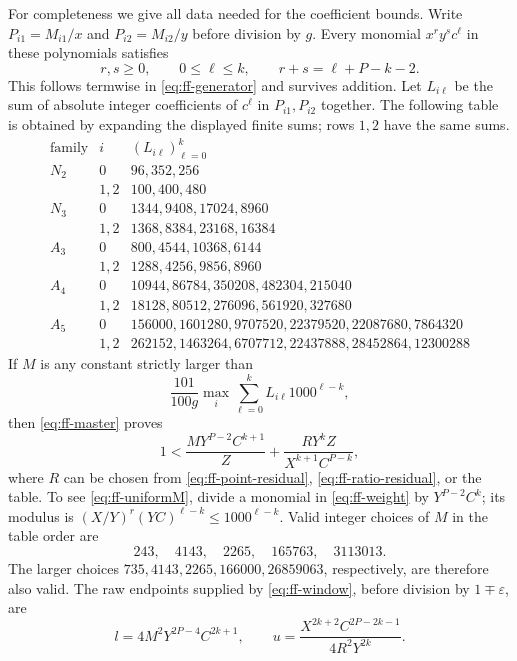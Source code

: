 \documentclass[12pt]{article}
\numberwithin{equation}{section}
\begin{document}
For completeness we give all data needed for the coefficient bounds.
Write $P_{i1}=M_{i1}/x$ and $P_{i2}=M_{i2}/y$ before division by $g$.
Every monomial $x^r y^s c^\ell$ in these polynomials satisfies
\begin{equation}\label{eq:ff-weight}
 r,s\ge0,\qquad 0\le\ell\le k,\qquad r+s=\ell+P-k-2.
\end{equation}
This follows termwise in \eqref{eq:ff-generator} and survives addition.
Let $L_{i\ell}$ be the sum of absolute integer coefficients of
$c^\ell$ in $P_{i1},P_{i2}$ together. The following table is obtained
by expanding the displayed finite sums; rows $1,2$ have the same sums.
\[
\begin{array}{c|c|l}
 \text{family}&i&(L_{i\ell})_{\ell=0}^k\\ \hline
N_2&0&96,352,256\\
 &1,2&100,400,480\\
N_3&0&1344,9408,17024,8960\\
 &1,2&1368,8384,23168,16384\\
A_3&0&800,4544,10368,6144\\
 &1,2&1288,4256,9856,8960\\
A_4&0&10944,86784,350208,482304,215040\\
 &1,2&18128,80512,276096,561920,327680\\
A_5&0&156000,1601280,9707520,22379520,22087680,7864320\\
 &1,2&262152,1463264,6707712,22437888,28452864,12300288
\end{array}
\]
If $M$ is any constant strictly larger than
\begin{equation}\label{eq:ff-uniformM}
 \frac{101}{100g}\max_i\sum_{\ell=0}^k
                       L_{i\ell}1000^{\ell-k},
\end{equation}
then \eqref{eq:ff-master} proves
\begin{equation}\label{eq:ff-two-inequality}
 1<\frac{M Y^{P-2}C^{k+1}}Z
       +\frac{R Y^kZ}{X^{k+1}C^{P-k}},
\end{equation}
where $R$ can be chosen from \eqref{eq:ff-point-residual},
\eqref{eq:ff-ratio-residual}, or the table.
To see \eqref{eq:ff-uniformM}, divide a monomial in
\eqref{eq:ff-weight} by $Y^{P-2}C^k$; its modulus is
$(X/Y)^r(YC)^{\ell-k}\le1000^{\ell-k}$.
Valid integer choices of $M$ in the table order are
\[
 243,\quad4143,\quad2265,\quad165763,\quad3113013.
\]
The larger choices $735,4143,2265,166000,26859063$, respectively,
are therefore also valid. The raw endpoints supplied by
\eqref{eq:ff-window}, before division by $1\mp\varepsilon$, are
\begin{equation}\label{eq:ff-two-endpoints}
 l=4M^2Y^{2P-4}C^{2k+1},\qquad
 u=\frac{X^{2k+2}C^{2P-2k-1}}{4R^2Y^{2k}}.
\end{equation}
\end{document}
